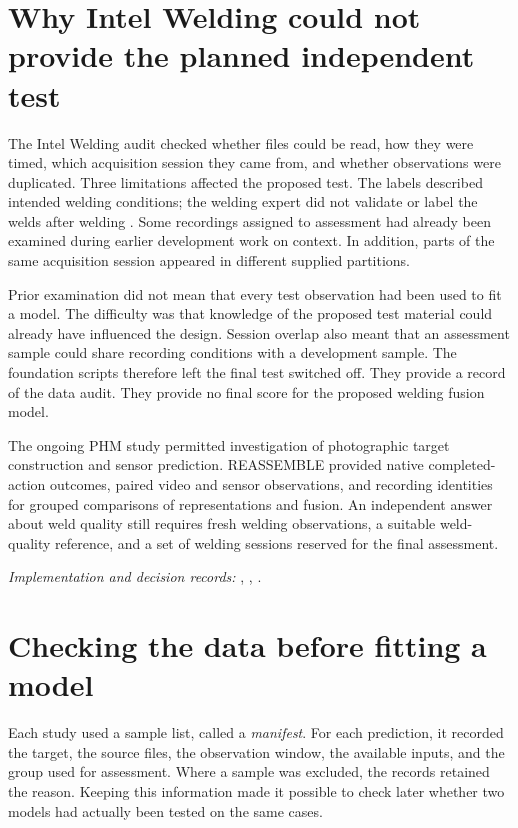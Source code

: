 \section{Why Intel Welding could not provide the planned independent test}
\label{sec:ch4-welding}

The Intel Welding audit checked whether files could be read, how they were timed, which
acquisition session they came from, and whether observations were duplicated. Three
limitations affected the proposed test. The labels described intended welding conditions;
the welding expert did not validate or label the welds after welding
\parencite{Stemmer2024Welding,IntelWeldingHF2024}. Some recordings assigned to assessment had already
been examined during earlier development work on context. In addition, parts of the same
acquisition session appeared in different supplied partitions.

Prior examination did not mean that every test observation had been used to fit a model.
The difficulty was that knowledge of the proposed test material could already have
influenced the design. Session overlap also meant that an assessment sample could share
recording conditions with a development sample. The foundation scripts therefore left
the final test switched off. They provide a record of the data audit. They provide no
final score for the proposed welding fusion model.

The ongoing PHM study permitted investigation of photographic target construction and
sensor prediction. REASSEMBLE provided native completed-action outcomes, paired video
and sensor observations, and recording identities for grouped comparisons of
representations and fusion. An independent answer about
weld quality still requires fresh welding observations, a suitable weld-quality
reference, and a set of welding sessions reserved for the final assessment.

\noindent\textit{Implementation and decision records:}
, ,
.

\section{Checking the data before fitting a model}
\label{sec:ch4-admission}

Each study used a sample list, called a \emph{manifest}. For each prediction, it
recorded the target, the source files, the observation window, the available inputs, and
the group used for assessment. Where a sample was excluded, the records retained the
reason. Keeping this information made it possible to check later whether two models had
actually been tested on the same cases.

